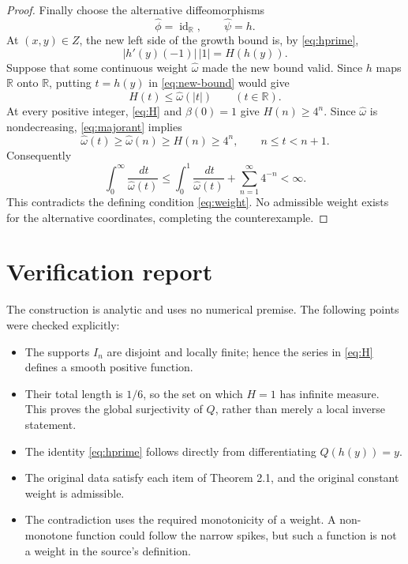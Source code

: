 \documentclass[11pt]{article}
\newcommand{\R}{\mathbb R}
\newcommand{\dd}{\,d}
\begin{document}
\begin{proof}
Finally choose the alternative diffeomorphisms
\[
       \widehat\phi=\operatorname{id}_{\R},\qquad
       \widehat\psi=h.
\]
At $(x,y)\in Z$, the new left side of the growth bound is, by
\eqref{eq:hprime},
\begin{equation}
       |h'(y)(-1)|\,|1|=H(h(y)).                       \label{eq:new-bound}
\end{equation}
Suppose that some continuous weight $\widehat\omega$ made the new bound
valid.  Since $h$ maps $\R$ onto $\R$, putting $t=h(y)$ in
\eqref{eq:new-bound} would give
\begin{equation}
                       H(t)\leq\widehat\omega(|t|)
                       \qquad(t\in\R).                 \label{eq:majorant}
\end{equation}
At every positive integer, \eqref{eq:H} and $\beta(0)=1$ give
$H(n)\geq4^n$.  Since $\widehat\omega$ is nondecreasing,
\eqref{eq:majorant} implies
\[
       \widehat\omega(t)\geq\widehat\omega(n)
       \geq H(n)\geq4^n,
       \qquad n\leq t<n+1.
\]
Consequently
\[
 \int_0^\infty\frac{\dd t}{\widehat\omega(t)}
 \leq \int_0^1\frac{\dd t}{\widehat\omega(t)}
      +\sum_{n=1}^\infty4^{-n}<\infty.
\]
This contradicts the defining condition \eqref{eq:weight}.  No admissible
weight exists for the alternative coordinates, completing the
counterexample.
\end{proof}

\section{Verification report}

The construction is analytic and uses no numerical premise.  The following
points were checked explicitly:
\begin{itemize}
  \item The supports $I_n$ are disjoint and locally finite; hence the series
  in \eqref{eq:H} defines a smooth positive function.
  \item Their total length is $1/6$, so the set on which $H=1$ has infinite
  measure.  This proves the global surjectivity of $Q$, rather than merely a
  local inverse statement.
  \item The identity \eqref{eq:hprime} follows directly from differentiating
  $Q(h(y))=y$.
  \item The original data satisfy each item of Theorem 2.1, and the original
  constant weight is admissible.
  \item The contradiction uses the required monotonicity of a weight.  A
  non-monotone function could follow the narrow spikes, but such a function
  is not a weight in the source's definition.
\end{itemize}
\end{document}
